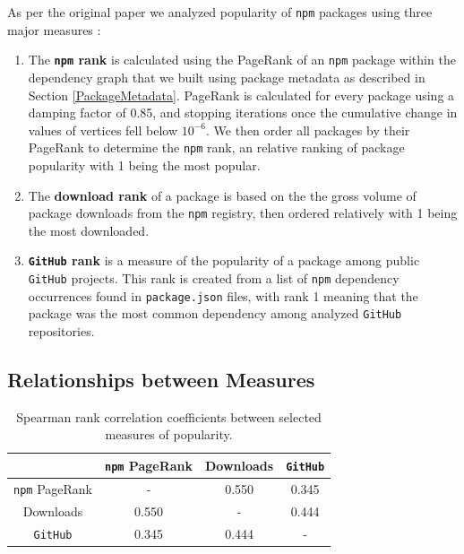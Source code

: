 \documentclass[10pt,conference]{IEEEtran}
\def\code#1{\texttt{#1}}
\begin{document}
As per the original paper we analyzed popularity of \code{npm} packages using three major measures \cite{Wittern:2016}:
\begin{enumerate}
  \item The \textbf{\code{npm} rank} is calculated using the PageRank\cite{brin1998anatomy} of an \code{npm} package within the dependency graph that we built using
    package metadata as described in Section \ref{PackageMetadata}. PageRank is calculated for every package using a damping factor of 0.85,
    and stopping iterations once the cumulative change in values of vertices fell below $10^{-6}$. We then order all packages by their PageRank to determine the
    \code{npm} rank, an relative ranking of package popularity with 1 being the most popular.
  \item The \textbf{download rank} of a package is based on the the gross volume of package downloads from the \code{npm}
    registry, then ordered relatively with 1 being the most downloaded.
  \item \textbf{\code{GitHub} rank} is a measure of the popularity of a package among public \code{GitHub} projects.
    This rank is created from a list of \code{npm} dependency occurrences found in \code{package.json} files, with rank 1
    meaning that the package was the most common dependency among analyzed \code{GitHub} repositories.  
\end{enumerate}


\subsection{Relationships between Measures}\label{metricDiff}

\begin{table}
  \centering
  \begin{tabular}{c|c c c}
     & \code{npm} PageRank & Downloads & \code{GitHub} \\
    \hline
    \code{npm} PageRank & - & 0.550 & 0.345\\
    Downloads & 0.550 & - & 0.444\\
    \code{GitHub} & 0.345 & 0.444 & -\\

  \end{tabular}
  \caption{Spearman rank correlation coefficients between selected measures of popularity.}
  \label{corr}
\end{table}
\end{document}
